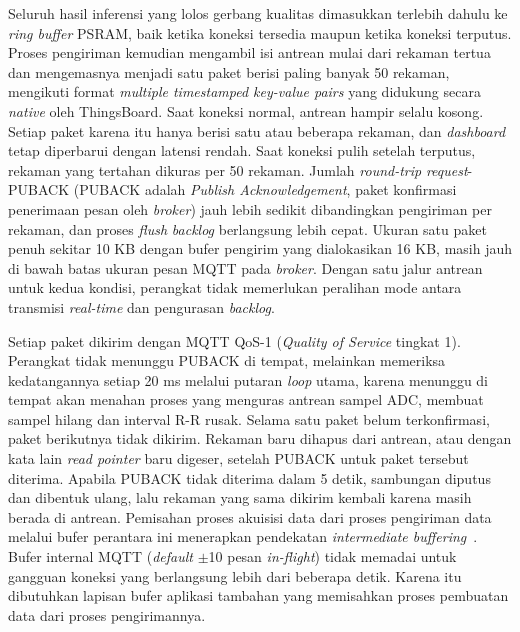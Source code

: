 Seluruh hasil inferensi yang lolos gerbang kualitas dimasukkan terlebih dahulu ke
\textit{ring buffer} PSRAM, baik ketika koneksi tersedia maupun ketika koneksi
terputus. Proses pengiriman kemudian mengambil isi antrean mulai dari rekaman
tertua dan mengemasnya menjadi satu paket berisi paling banyak 50 rekaman,
mengikuti format \textit{multiple timestamped key-value pairs} yang didukung
secara \textit{native} oleh ThingsBoard. Saat koneksi normal, antrean hampir selalu kosong.
Setiap paket karena itu hanya berisi satu atau beberapa rekaman, dan \textit{dashboard}
tetap diperbarui dengan latensi rendah. Saat koneksi pulih setelah terputus,
rekaman yang tertahan dikuras per 50 rekaman. Jumlah \textit{round-trip}
\textit{request}-PUBACK (PUBACK adalah \textit{Publish Acknowledgement}, paket konfirmasi
penerimaan pesan oleh \textit{broker}) jauh lebih sedikit dibandingkan pengiriman per
rekaman, dan proses \textit{flush} \textit{backlog} berlangsung lebih cepat. Ukuran satu
paket penuh sekitar 10 KB dengan bufer pengirim yang dialokasikan 16 KB, masih jauh di bawah batas ukuran pesan
MQTT pada \textit{broker}. Dengan satu jalur antrean untuk kedua kondisi, perangkat tidak
memerlukan peralihan mode antara transmisi \textit{real-time} dan pengurasan
\textit{backlog}.

Setiap paket dikirim dengan MQTT QoS-1 (\textit{Quality of Service} tingkat 1).
Perangkat tidak menunggu PUBACK di tempat, melainkan memeriksa kedatangannya
setiap 20 ms melalui putaran \textit{loop} utama, karena menunggu di tempat akan menahan proses
yang menguras antrean sampel ADC, membuat sampel hilang dan interval R-R rusak.
Selama satu paket belum terkonfirmasi, paket berikutnya tidak dikirim. Rekaman
baru dihapus dari antrean, atau dengan kata lain \textit{read pointer} baru
digeser, setelah PUBACK untuk paket tersebut diterima. Apabila PUBACK tidak
diterima dalam 5 detik, sambungan diputus dan dibentuk ulang, lalu rekaman yang
sama dikirim kembali karena masih berada di antrean. Pemisahan
proses akuisisi data dari proses pengiriman data melalui bufer perantara ini
menerapkan pendekatan \textit{intermediate buffering}~\cite{tipparaju_2021}. Bufer internal MQTT
(\textit{default} $\pm$10 pesan \textit{in-flight}) tidak memadai untuk gangguan koneksi yang
berlangsung lebih dari beberapa detik. Karena itu dibutuhkan lapisan bufer aplikasi
tambahan yang memisahkan proses pembuatan data dari proses pengirimannya.

